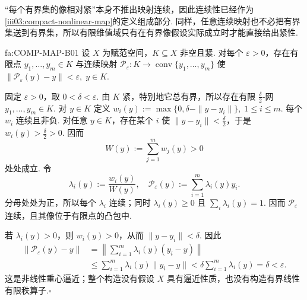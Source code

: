 \begin{FAWarning}[紧像不推出连续性]
“每个有界集的像相对紧”本身不推出映射连续，因此连续性已经作为\autoref{iii03:compact-nonlinear-map}的定义组成部分. 同样，任意连续映射也不必把有界集送到有界集，所以有限维值域只有在有界像假设实际成立时才能直接给出紧性.
\end{FAWarning}

\begin{FALemma}[B][紧像的非线性有限维逼近]{fa:COMP-MAP-B01}
设 \(\displaystyle X\) 为赋范空间，\(\displaystyle K\subseteq X\) 非空且紧. 对每个 \(\displaystyle \varepsilon>0\)，存在有限点 \(\displaystyle y_1,\dots,y_m\in K\) 与连续映射
\(\displaystyle \mathcal P_{\varepsilon}:K\to\operatorname{conv}\{y_1,\dots,y_m\}\)
使
\(\displaystyle \|\mathcal P_{\varepsilon}(y)-y\|<\varepsilon, \; y\in K.\)
\end{FALemma}

\begin{FAProof}
固定 \(\displaystyle \varepsilon>0\)，取 \(\displaystyle 0<\delta<\varepsilon\). 由 \(\displaystyle K\) 紧，特别地它总有界，所以存在有限 \(\displaystyle \frac{\delta}{2}\)-网 \(\displaystyle y_1,\dots,y_m\in K\). 对 \(\displaystyle y\in K\) 定义
\(\displaystyle w_i(y) := \max\{0,\delta-\|y-y_i\|\}, \; 1\leqslant i\leqslant m.\)
每个 \(\displaystyle w_i\) 连续且非负. 对任意 \(\displaystyle y\in K\)，存在某个 \(\displaystyle i\) 使 \(\displaystyle \|y-y_i\|<\frac{\delta}{2}\)，于是 \(\displaystyle w_i(y)>\frac{\delta}{2}>0\). 因而
\[
W(y):=\sum_{j=1}^{m}w_j(y)>0
\]
处处成立. 令
\[
\lambda_i(y)
:=
\frac{w_i(y)}{W(y)},
\quad
\mathcal P_{\varepsilon}(y)
:=
\sum_{i=1}^{m}\lambda_i(y)y_i.
\]
分母处处为正，所以每个 \(\displaystyle \lambda_i\) 连续；同时 \(\displaystyle \lambda_i(y)\geqslant0\) 且 \(\displaystyle \sum_i\lambda_i(y)=1\). 因而 \(\displaystyle \mathcal P_{\varepsilon}\) 连续，且其像位于有限点的凸包中.

若 \(\displaystyle \lambda_i(y)>0\)，则 \(\displaystyle w_i(y)>0\)，从而 \(\displaystyle \|y-y_i\|<\delta\). 因此
\[
\begin{aligned}
\|\mathcal P_{\varepsilon}(y)-y\|
&=
\left\|\sum_{i=1}^{m}\lambda_i(y)(y_i-y)\right\|\\
&\leqslant
\sum_{i=1}^{m}\lambda_i(y)\|y_i-y\|
<
\delta\sum_{i=1}^{m}\lambda_i(y)
=
\delta
<
\varepsilon.
\end{aligned}
\]
这是非线性重心逼近；整个构造没有假设 \(\displaystyle X\) 具有逼近性质，也没有构造有界线性有限秩算子.\hfill\(\square\)

\end{FAProof}


